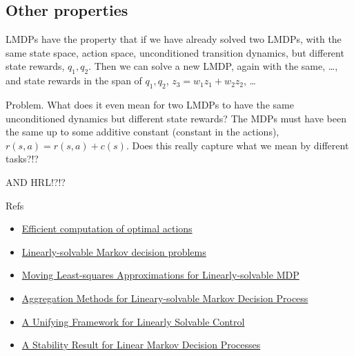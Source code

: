 \hypertarget{other-properties}{%
\subsection{Other properties}\label{other-properties}}

LMDPs have the property that if we have already solved two LMDPs, with
the same state space, action space, unconditioned transition dynamics,
but different state rewards, \(q_1, q_2\). Then we can solve a new LMDP,
again with the same, \ldots{}, and state rewards in the span of
\(q_1, q_2\), \(z_3 = w_1 z_1 + w_2 z_2\), \ldots{}

Problem. What does it even mean for two LMDPs to have the same
unconditioned dynamics but different state rewards? The MDPs must have
been the same up to some additive constant (constant in the actions),
\(r(s, a)=r(s, a) + c(s)\). Does this really capture what we mean by
different tasks?!?

AND HRL!?!?

Refs

\begin{itemize}
\tightlist
\item
  \href{https://www.pnas.org/content/106/28/11478}{Efficient computation
  of optimal actions}
\item
  \href{https://homes.cs.washington.edu/~todorov/papers/TodorovNIPS06.pdf}{Linearly-solvable
  Markov decision problems}
\item
  \href{https://ieeexplore.ieee.org/stamp/stamp.jsp?arnumber=5967383}{Moving
  Least-squares Approximations for Linearly-solvable MDP}
\item
  \href{https://homes.cs.washington.edu/~todorov/papers/ZhongIFAC11.pdf}{Aggregation
  Methods for Lineary-solvable Markov Decision Process}
\item
  \href{https://arxiv.org/abs/1202.3715}{A Unifying Framework for
  Linearly Solvable Control}
\item
  \href{http://www.optimization-online.org/DB_FILE/2017/03/5893.pdf}{A
  Stability Result for Linear Markov Decision Processes}
\end{itemize}
